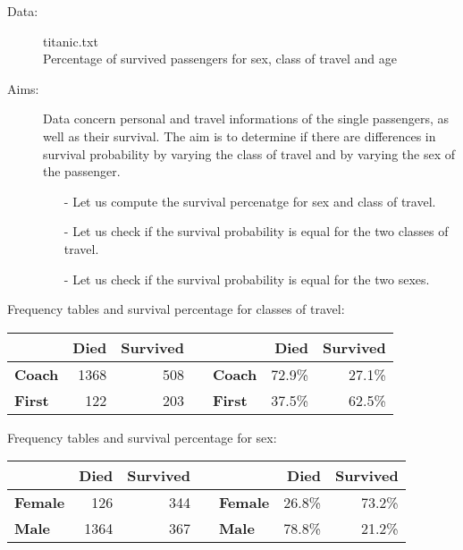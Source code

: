 
\begin{frame} 
  \begin{description}
    \item[Data:] titanic.txt\\ 
      Percentage of survived passengers for sex, class of travel and age
    \item[Aims:]
      \begin{small}
        Data concern personal and travel informations of the single passengers, as well as their survival. The aim is to determine if there are differences in survival probability by varying the class of travel and by varying the sex of the passenger.  
        \begin{itemize}
          \item[-] Let us compute the survival percenatge for sex and class of travel.
          \item[-] Let us check if the survival probability is equal for the two classes of travel.
          \item[-] Let us check if the survival probability is equal for the two sexes.
        \end{itemize}
      \end{small}
  \end{description}
\end{frame}

\begin{frame}
  Frequency tables and survival percentage for classes of travel:\\
  \begin{center}
    \begin{tabular}{|l|rr|c|l|rr|}
      \hline	
      & \textbf{Died} & \textbf{Survived} & &  &  \textbf{Died} & \textbf{Survived} \\
      \hline
      \textbf{Coach} & 1368 & 508 & & \textbf{Coach} & 72.9\% & 27.1\% \\
      \textbf{First} & 122 & 203 & & \textbf{First} & 37.5\% & 62.5\% \\
      \hline
    \end{tabular} 
  \end{center}
  Frequency tables and survival percentage for sex:
  \begin{center}
    \begin{tabular}{|l|rr|c|l|rr|}
      \hline	
      & \textbf{Died} & \textbf{Survived} & &  &  \textbf{Died} & \textbf{Survived} \\
      \hline
      \textbf{Female} & 126 & 344 & & \textbf{Female} & 26.8\% & 73.2\% \\
      \textbf{Male} & 1364 & 367 & & \textbf{Male} & 78.8\% & 21.2\% \\
      \hline
    \end{tabular} 
  \end{center}
\end{frame}

